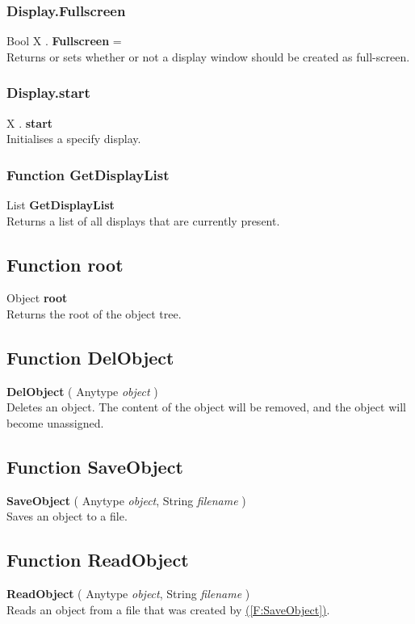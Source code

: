 \documentclass[10pt]{book}
\newcommand{\linkitem}[1]{\hyperref[#1]{\nameref{#1} (\ref{#1})}}
\begin{document}
\subsubsection{Display.Fullscreen \label{F:Display:Fullscreen}}
Bool X . \textbf{Fullscreen} = \\
Returns or sets whether or not a display window should be created as full-screen.


\subsubsection{Display.start \label{F:Display:start}}
X . \textbf{start} \\
Initialises a specify display.

\subsubsection{Function GetDisplayList \label{F:GetDisplayList}}
List \textbf{GetDisplayList} \\
Returns a list of all displays that are currently present.

\subsection{Function root \label{F:root}}
Object \textbf{root} \\
Returns the root of the object tree.

\subsection{Function DelObject \label{F:DelObject}}
\textbf{DelObject} ( Anytype \textit{object} ) \\
Deletes an object. The content of the object will be removed, and the object will become unassigned.

\subsection{Function SaveObject \label{F:SaveObject}}
\textbf{SaveObject} ( Anytype \textit{object}, String \textit{filename} ) \\
Saves an object to a file.

\subsection{Function ReadObject \label{F:ReadObject}}
\textbf{ReadObject} ( Anytype \textit{object}, String \textit{filename} ) \\
Reads an object from a file that was created by \linkitem{F:SaveObject}.
\end{document}
